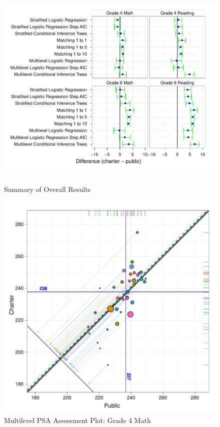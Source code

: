 \documentclass[man,floatsintext]{apa6}
\begin{document}


\begin{figure}[t]
\begin{center}
\includegraphics[height=4in]{../Figures/overallsummary.pdf}
\caption{Summary of Overall Results}
\label{fig:overallresults}
\end{center}
\end{figure}

\printbibliography

\appendix

\begin{figure}[t]
\begin{center}
\includegraphics[width=\textwidth]{../Figures/g4mathtreecircplot.pdf}
\caption{Multilevel PSA Assessment Plot: Grade 4 Math}
\label{g4mathtreecircplot.pdf}
\end{center}
\end{figure}
\end{document}
